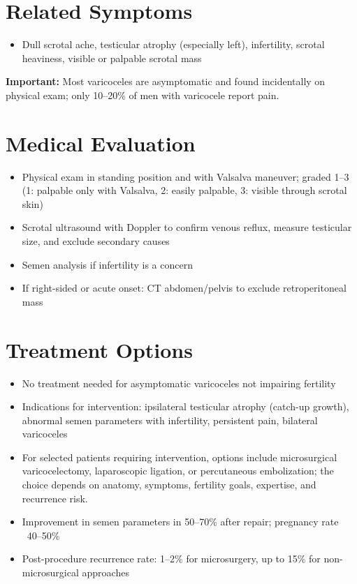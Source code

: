 \section*{Related Symptoms}
\begin{itemize}
  \item Dull scrotal ache, testicular atrophy (especially left), infertility, scrotal heaviness, visible or palpable scrotal mass
\end{itemize}
\textbf{Important:} Most varicoceles are asymptomatic and found incidentally on physical exam; only 10--20\% of men with varicocele report pain.

\section*{Medical Evaluation}
\begin{itemize}
  \item Physical exam in standing position and with Valsalva maneuver; graded 1--3 (1: palpable only with Valsalva, 2: easily palpable, 3: visible through scrotal skin)
  \item Scrotal ultrasound with Doppler to confirm venous reflux, measure testicular size, and exclude secondary causes
  \item Semen analysis if infertility is a concern
  \item If right-sided or acute onset: CT abdomen/pelvis to exclude retroperitoneal mass
\end{itemize}

\section*{Treatment Options}
\begin{itemize}
  \item No treatment needed for asymptomatic varicoceles not impairing fertility
  \item Indications for intervention: ipsilateral testicular atrophy (catch-up growth), abnormal semen parameters with infertility, persistent pain, bilateral varicoceles
  \item For selected patients requiring intervention, options include microsurgical varicocelectomy, laparoscopic ligation, or percutaneous embolization; the choice depends on anatomy, symptoms, fertility goals, expertise, and recurrence risk.
  \item Improvement in semen parameters in 50--70\% after repair; pregnancy rate ~40--50\%
  \item Post-procedure recurrence rate: 1--2\% for microsurgery, up to 15\% for non-microsurgical approaches
\end{itemize}

